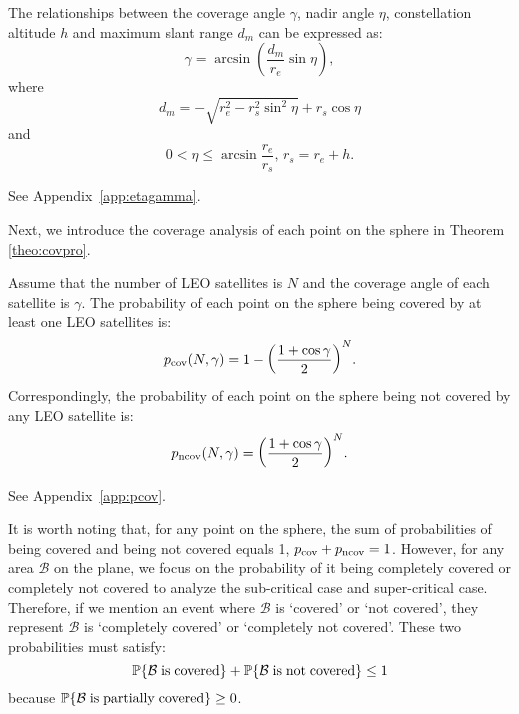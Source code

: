 \documentclass[final]{IEEEtran}
\begin{document}
\begin{lemma}\label{lem:etagamma}
   The relationships between the coverage angle $\gamma$, nadir angle $\eta$, constellation altitude $h$ and maximum slant range $d_m$ can be expressed as:
   \begin{equation}
       \gamma=\arcsin(\frac{d_m}{r_e}\sin\eta),
   \end{equation}
where
\begin{equation}
    d_m=-\sqrt{r_e^2-r_s^2\sin^2\eta}+r_s \cos\eta
\end{equation}
and
\begin{equation}
    0<\eta\leq \arcsin{\frac{r_e}{r_s}},\, r_s=r_e+h.
\end{equation}
\end{lemma}
\begin{IEEEproof}
    See Appendix~\ref{app:etagamma}.
\end{IEEEproof}
 Next, we introduce the coverage analysis of each point on the sphere in Theorem \ref{theo:covpro}.
\begin{theorem}\label{theo:covpro} Assume that the number of LEO satellites is $N$ and the coverage angle of each satellite is $
\gamma$. The probability of each point on the sphere being covered by at least one LEO satellites is:
    \begin{equation}
        p_{\rm cov}(N,\gamma)=1-\bigg(\frac{1+\cos\gamma}{2}\bigg)^{N}.
    \end{equation}
    \label{theo:pcov}
Correspondingly, the probability of each point on the sphere being not covered by any LEO satellite is:
    \begin{equation}
        p_{\rm ncov}(N,\gamma)=\bigg(\frac{1+\cos\gamma}{2}\bigg)^{N}.
    \end{equation}
    
\end{theorem}
\begin{IEEEproof}
    See Appendix~\ref{app:pcov}.
\end{IEEEproof}
It is worth noting that, for any point on the sphere, the sum of probabilities of being covered and being not covered equals 1, \ie $p_{\rm cov}+p_{\rm ncov}=1$. However, for any area $\mathcal{B}$ on the plane, we focus on the probability of it being completely covered or completely not covered to analyze the sub-critical case and super-critical case. Therefore, if we mention an event where $\mathcal{B}$ is `covered' or `not covered', they represent $\mathcal{B}$ is `completely covered' or `completely not covered'. These two probabilities must satisfy:  
\begin{equation}
    \P\{\mathcal{B} {\rm \; is\;covered}\}+\P\{\mathcal{B} {\rm \; is\;not\;covered}\}\leq 1
\end{equation}
because $\P\{\mathcal{B} {\rm \; is\;partially\;covered}\}\geq 0$.
\end{document}
